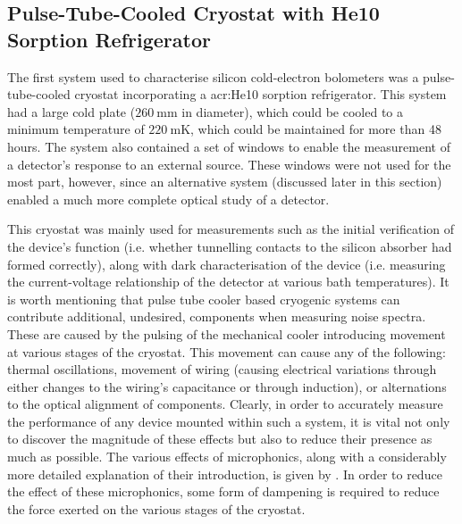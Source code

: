 \subsection{Pulse-Tube-Cooled Cryostat with He10 Sorption Refrigerator}
\label{ssec:Aloysius}
The first system used to characterise silicon cold-electron bolometers was a pulse-tube-cooled cryostat incorporating a \gls{acr:He10} sorption refrigerator. This system had a large cold plate ($260~\mathrm{mm}$ in diameter), which could be cooled to a minimum temperature of $220~\mathrm{mK}$, which could be maintained for more than 48 hours. The system also contained a set of windows to enable the measurement of a detector's response to an external source. These windows were not used for the most part, however, since an alternative system (discussed later in this section) enabled a much more complete optical study of a detector.
\par 
This cryostat was mainly used for measurements such as the initial verification of the device's function (i.e. whether tunnelling contacts to the silicon absorber had formed correctly), along with dark characterisation of the device (i.e. measuring the current-voltage relationship of the detector at various bath temperatures). It is worth mentioning that pulse tube cooler based cryogenic systems can contribute  additional, undesired, components when measuring noise spectra. These are caused by the pulsing of the mechanical cooler introducing movement at various stages of the cryostat. This movement can cause any of the following: thermal oscillations, movement of wiring (causing electrical variations through either changes to the wiring's capacitance or through induction), or alternations to the optical alignment of components. Clearly, in order to accurately measure the performance of any device mounted within such a system, it is vital not only to discover the magnitude of these effects but also to reduce their presence as much as possible. The various effects of microphonics, along with a considerably more detailed explanation of their introduction, is given by \textcite{Bhatia1999}. In order to reduce the effect of these microphonics, some form of dampening is required to reduce the force exerted on the various stages of the cryostat.
